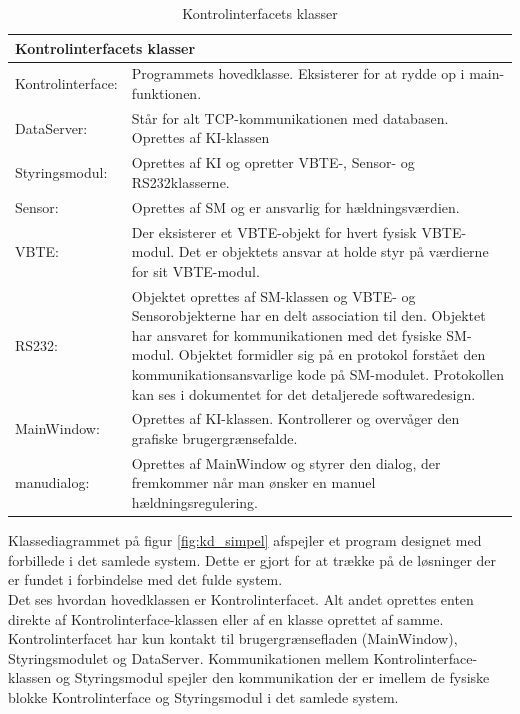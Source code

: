 \begin{table}[H]
\centering
{}
\begin{tabular}{| p{3cm}  p{12.5cm}|}
\multicolumn{2}{l}{{\Large Kontrolinterfacets klasser}} \\\hline
Kontrolinterface:&Programmets hovedklasse. Eksisterer for at rydde op i main-funktionen.\\\hline
DataServer:&Står for alt TCP-kommunikationen med databasen. Oprettes af KI-klassen\\\hline
Styringsmodul:&Oprettes af KI og opretter VBTE-, Sensor- og RS232klasserne.\\\hline
Sensor:&Oprettes af SM og er ansvarlig for hældningsværdien.\\\hline
VBTE:&Der eksisterer et VBTE-objekt for hvert fysisk VBTE-modul. Det er objektets ansvar at holde styr på værdierne for sit VBTE-modul.\\\hline
RS232:&Objektet oprettes af SM-klassen og VBTE- og Sensorobjekterne har en delt association til den. Objektet har ansvaret for kommunikationen med det fysiske SM-modul. Objektet formidler sig på en protokol forstået den kommunikationsansvarlige kode på SM-modulet. Protokollen kan ses i dokumentet for det detaljerede softwaredesign.\\\hline
MainWindow:&Oprettes af KI-klassen. Kontrollerer og overvåger den grafiske brugergrænsefalde.\\\hline
manudialog:&Oprettes af MainWindow og styrer den dialog, der fremkommer når man ønsker en manuel hældningsregulering.\\\hline
\end{tabular}
\caption{Kontrolinterfacets klasser}
\label{tabel:ki-klasser}
\end{table}

Klassediagrammet på figur \ref{fig:kd_simpel} afspejler et program designet med forbillede i det samlede system. Dette er gjort for at trække på de løsninger der er fundet i forbindelse med det fulde system. \\
Det ses hvordan hovedklassen er Kontrolinterfacet. Alt andet oprettes enten direkte af Kontrolinterface-klassen eller af en klasse oprettet af samme. Kontrolinterfacet har kun kontakt til brugergrænsefladen (MainWindow), Styringsmodulet og DataServer. Kommunikationen mellem Kontrolinterface-klassen og Styringsmodul spejler den kommunikation der er imellem de fysiske blokke Kontrolinterface og Styringsmodul i det samlede system.\\

